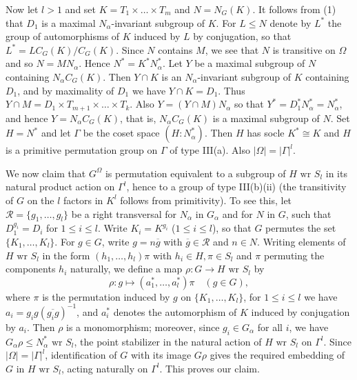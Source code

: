 Now let $l>1$ and set $K=T_1 \times \dots \times T_m$ and $N=N_G(K)$. It follows from (1) that $D_1$ is a maximal $N_\alpha$-invariant subgroup of $K$. For $L \le N$ denote by $L^*$ the group of automorphisms of $K$ induced by $L$ by conjugation, so that $L^*=LC_G(K)/C_G(K)$. Since $N$ contains $M$, we see that $N$ is transitive on $\Omega$ and so $N=MN_\alpha$. Hence $N^*=K^*N_\alpha^*$. Let $Y$ be a maximal subgroup of $N$ containing $N_\alpha C_G(K)$. Then $Y \cap K$ is an $N_\alpha$-invariant subgroup of $K$ containing $D_1$, and by maximality of $D_1$ we have $Y \cap K = D_1$. Thus $Y \cap M = D_1 \times T_{m+1} \times \dots \times T_k$. Also $Y = (Y \cap M)N_\alpha$ so that $Y^* = D_1^* N_\alpha^* = N_\alpha^*$, and hence $Y=N_\alpha C_G(K)$, that is, $N_\alpha C_G(K)$ is a maximal subgroup of $N$. Set $H=N^*$ and let $\Gamma$ be the coset space $(H:N_\alpha^*)$. Then $H$ has socle $K^* \cong K$ and $H$ is a primitive permutation group on $\Gamma$ of type III(a). Also $|\Omega| = |\Gamma|^l$.

We now claim that $G^\Omega$ is permutation equivalent to a subgroup of $H \text{ wr } S_l$ in its natural product action on $\Gamma^l$, hence to a group of type III(b)(ii) (the transitivity of $G$ on the $l$ factors in $K^l$ follows from primitivity). To see this, let $\mathcal{R} = \{g_1, \dots, g_l\}$ be a right transversal for $N_\alpha$ in $G_\alpha$ and for $N$ in $G$, such that $D_1^{g_i} = D_i$ for $1 \le i \le l$. Write $K_i = K^{g_i}$ ($1 \le i \le l$), so that $G$ permutes the set $\{K_1, \dots, K_l\}$. For $g \in G$, write $g = n\overline{g}$ with $\overline{g} \in \mathcal{R}$ and $n \in N$. Writing elements of $H \text{ wr } S_l$ in the form $(h_1, \dots, h_l)\pi$ with $h_i \in H, \pi \in S_l$ and $\pi$ permuting the components $h_i$ naturally, we define a map $\rho: G \to H \text{ wr } S_l$ by
$$ \rho: g \mapsto (a_1^*, \dots, a_l^*)\pi \quad (g \in G), $$
where $\pi$ is the permutation induced by $g$ on $\{K_1, \dots, K_l\}$, for $1 \le i \le l$ we have $a_i = g_i g (\overline{g_i g})^{-1}$, and $a_i^*$ denotes the automorphism of $K$ induced by conjugation by $a_i$. Then $\rho$ is a monomorphism; moreover, since $g_i \in G_\alpha$ for all $i$, we have $G_\alpha \rho \le N_\alpha^* \text{ wr } S_l$, the point stabilizer in the natural action of $H \text{ wr } S_l$ on $\Gamma^l$. Since $|\Omega| = |\Gamma|^l$, identification of $G$ with its image $G\rho$ gives the required embedding of $G$ in $H \text{ wr } S_l$, acting naturally on $\Gamma^l$. This proves our claim.

